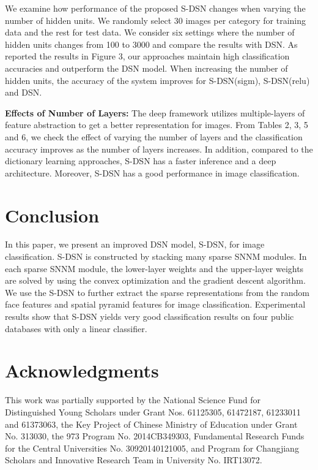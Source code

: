 \documentclass[letterpaper]{article}
\begin{document}
We examine how performance of the proposed S-DSN changes when varying the number of hidden units. We randomly select 30 images per category for training data and the rest for test data. We consider six settings where the number of hidden units changes from 100 to 3000 and compare the results with DSN. As reported the results in Figure 3, our approaches maintain high classification accuracies and outperform the DSN model. When increasing the number of hidden units, the accuracy of the system improves for S-DSN(sigm), S-DSN(relu) and DSN.

\textbf{Effects of Number of Layers:} The deep framework utilizes multiple-layers of feature abstraction to get a better representation for images. From Tables  2, 3, 5 and 6, we check the effect of varying the number of layers and the classification accuracy improves as the number of layers increases. In addition, compared to the dictionary learning approaches, S-DSN has a faster inference and a deep architecture. Moreover, S-DSN has a good performance in image classification.


\section{Conclusion}
\label{sec:cons}

In this paper, we present an improved DSN model, S-DSN, for image classification. S-DSN is constructed by stacking many sparse SNNM modules. In each sparse SNNM module, the lower-layer weights and the upper-layer weights are solved by using the convex optimization and the gradient descent algorithm. We use the S-DSN to further extract the sparse representations from the random face features and spatial pyramid features for image classification. Experimental results show that S-DSN yields very good classification results on four public databases with only a linear classifier.

\section{Acknowledgments}
This work was partially supported by the National Science Fund for Distinguished Young Scholars under Grant Nos. 61125305, 61472187, 61233011 and 61373063, the Key Project of Chinese Ministry of Education under Grant No. 313030, the 973 Program No. 2014CB349303, Fundamental Research Funds for the Central Universities No. 30920140121005, and Program for Changjiang Scholars and Innovative Research Team in University No. IRT13072.

{\small


}
\end{document}
